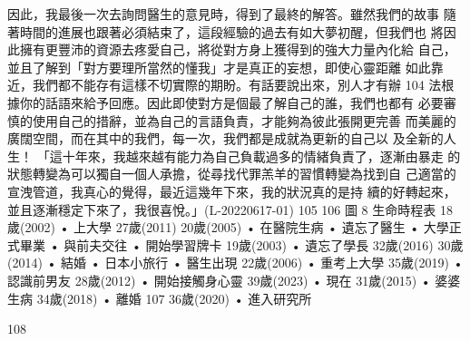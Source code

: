 因此，我最後一次去詢問醫生的意見時，得到了最終的解答。雖然我們的故事
隨著時間的進展也跟著必須結束了，這段經驗的過去有如大夢初醒，但我們也
將因此擁有更豐沛的資源去疼愛自己，將從對方身上獲得到的強大力量內化給
自己，並且了解到「對方要理所當然的懂我」才是真正的妄想，即使心靈距離
如此靠近，我們都不能存有這樣不切實際的期盼。有話要說出來，別人才有辦
104 
法根據你的話語來給予回應。因此即使對方是個最了解自己的誰，我們也都有
必要審慎的使用自己的措辭，並為自己的言語負責，才能夠為彼此張開更完善
而美麗的廣闊空間，而在其中的我們，每一次，我們都是成就為更新的自己以
及全新的人生！ 
「這十年來，我越來越有能力為自己負載過多的情緒負責了，逐漸由暴走
的狀態轉變為可以獨自一個人承擔，從尋找代罪羔羊的習慣轉變為找到自
己適當的宣洩管道，我真心的覺得，最近這幾年下來，我的狀況真的是持
續的好轉起來，並且逐漸穩定下來了，我很喜悅。」(L-20220617-01) 
105 
106 
圖 8  
生命時程表 
18歲(2002)
 • 上大學
27歲(2011)
 20歲(2005)
 • 在醫院生病
• 遺忘了醫生
• 大學正式畢業
• 與前夫交往
• 開始學習牌卡
19歲(2003)
 • 遺忘了學長
32歲(2016)
 30歲(2014)
 • 結婚
• 日本小旅行
• 醫生出現
22歲(2006)
 • 重考上大學
35歲(2019)
 • 認識前男友
28歲(2012)
 • 開始接觸身心靈
39歲(2023)
 • 現在
31歲(2015)
 • 婆婆生病
34歲(2018)
 • 離婚
107 
36歲(2020)
 • 進入研究所
 
108 
 
